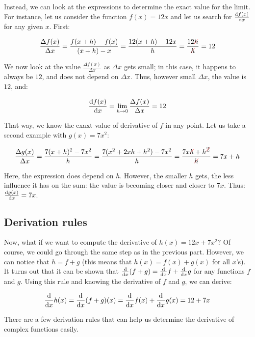 Instead, we can look at the expressions to determine the exact value
for the limit. For instance, let us consider the function $f(x) = 12x$
and let us search for $\frac {\mathrm{d} f(x)} {\mathrm{d} x}$ for any given $x$. First:

\[
\frac {\Delta f(x)} {\Delta x}
= \frac {f(x+h) - f(x)} {(x+h) - x}
= \frac {12(x+h) - 12x} {h}
= \frac {12\strike[red]{h}} {\strike[red]{h}}
= 12
\]

We now look at the value $\frac {\Delta f(x)} {\Delta x}$ as $\Delta x$
gets small; in this case, it happens to always be $12$, and does not
depend on $\Delta x$. Thus, however small $\Delta x$, the value is
$12$, and:

\[
\frac {\mathrm{d} f(x)} {\mathrm{d} x}
= \lim_{h \to 0} \frac {\Delta f(x)} {\Delta x}
= 12
\]

That way, we know the exaxt value of derivative of $f$ in any point. Let
us take a second example with $g(x) = 7x^2$:

\[
\frac {\Delta g(x)} {\Delta x}
= \frac {7(x+h)^2 - 7x^2} {h}
= \frac {7(x^2 + 2xh + h^2) - 7x^2} {h}
= \frac {7x\strike[red]{h} + h^{\strike[red]{2}}} {\strike[red]{h}}
= 7x + h
\]

Here, the expression does depend on $h$. However, the smaller $h$ gets,
the less influence it has on the sum: the value is becoming closer and
closer to $7x$. Thus: $\frac {\mathrm{d} g(x)} {\mathrm{d} x} = 7x$.


\subsection{Derivation rules}

Now, what if we want to compute the derivative of $h(x) = 12x +
7x^2$? Of course, we could go through the same step as in the previous
part. However, we can notice that $h = f + g$ (this means that $h(x)
= f(x) + g(x)$ for all $x$'s). It turns out that it can be shown that
$\frac {\mathrm{d}} {\mathrm{d} x} (f+g) = \frac {\mathrm{d}} {\mathrm{d} x} f + \frac {\mathrm{d}} {\mathrm{d} x} g$
for any functions $f$ and $g$. Using this rule and knowing the derivative
of $f$ and $g$, we can derive:

\[
\frac {\mathrm{d}} {\mathrm{d} x} h(x)
= \frac {\mathrm{d}} {\mathrm{d} x} (f+g)(x)
= \frac {\mathrm{d}} {\mathrm{d} x} f(x) + \frac {\mathrm{d}} {\mathrm{d} x} g(x)
= 12 + 7x
\]

There are a few derivation rules that can help us determine the derivative
of complex functions easily.

